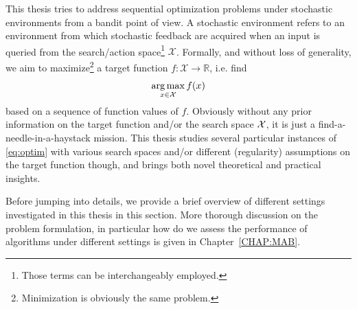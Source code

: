 This thesis tries to address sequential optimization problems under stochastic environments from a bandit point of view. A stochastic environment refers to an environment from which stochastic feedback are acquired when an input is queried from the search/action space\footnote{Those terms can be interchangeably employed.} $\mathcal{X}$. Formally, and without loss of generality, we aim to maximize\footnote{Minimization is obviously the same problem.} a target function $f:\mathcal{X}\rightarrow\mathbb{R}$, i.e. find 
\begin{equation}\label{eq:optim}
    \operatorname*{arg\,max}_{x\in\mathcal{X}} f(x)
\end{equation}
based on a sequence of function values of $f$. Obviously without any prior information on the target function and/or the search space $\mathcal{X}$, it is just a find-a-needle-in-a-haystack mission. This thesis studies several particular instances of \eqref{eq:optim} with various search spaces and/or different (regularity) assumptions on the target function though, and brings both novel theoretical and practical insights. 

Before jumping into details, we provide a brief overview of different settings investigated in this thesis in this section. More thorough discussion on the problem formulation, in particular how do we assess the performance of algorithms under different settings is given in Chapter~\ref{CHAP:MAB}.



